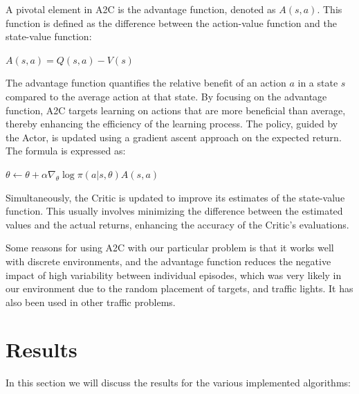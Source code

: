\documentclass{article}
\begin{document}
    A pivotal element in A2C is the advantage function, denoted as \( A(s, a) \). This function is defined as the difference between the action-value function and the state-value function: 
    
    \begin{center}
        $A(s, a) = Q(s, a) - V(s)$
    \end{center}
    
    The advantage function quantifies the relative benefit of an action \( a \) in a state \( s \) compared to the average action at that state. By focusing on the advantage function, A2C targets learning on actions that are more beneficial than average, thereby enhancing the efficiency of the learning process. The policy, guided by the Actor, is updated using a gradient ascent approach on the expected return. The formula is expressed as: 
    \begin{center}
        $\theta \leftarrow \theta + \alpha \nabla_{\theta} \log \pi(a | s, \theta) A(s, a)$
    \end{center}
    
    Simultaneously, the Critic is updated to improve its estimates of the state-value function. This usually involves minimizing the difference between the estimated values and the actual returns, enhancing the accuracy of the Critic's evaluations.
    
    Some reasons for using A2C with our particular problem is that it works well with discrete environments, and the advantage function reduces the negative impact of high variability between individual episodes, which was very likely in our environment due to the random placement of targets, and traffic lights. It has also been used in other traffic problems.

    \section{Results}
    \label{results}
    In this section we will discuss the results for the various implemented algorithms:
    
\end{document}

